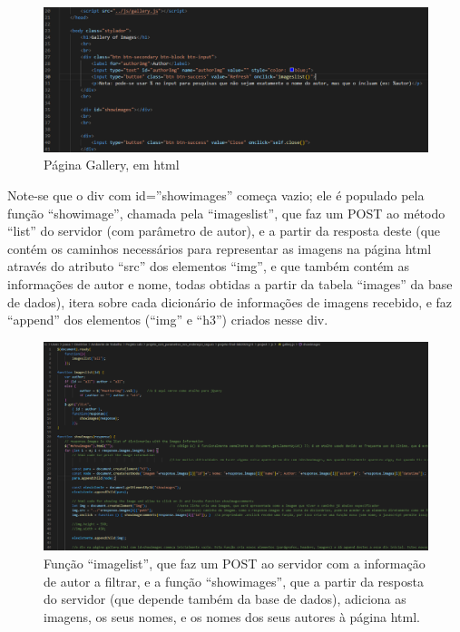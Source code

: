 \documentclass{report}
\begin{document}
 \begin{figure}[hbp]

        \includegraphics[scale=0.5]{Images_code/10 - html gallery.png}
        \caption{\label{Estrutura}Página Gallery, em html}
\end{figure}


 Note-se que o div com id=”showimages” começa vazio; ele é populado pela função “showimage”, chamada pela “imageslist”, que faz um POST ao método “list” do servidor (com parâmetro de autor), e a partir da resposta deste (que contém os caminhos necessários para representar as imagens na página html através do atributo “src” dos elementos “img”, e que também contém as informações de autor e nome, todas obtidas a partir da tabela “images” da base de dados), itera sobre cada dicionário de informações de imagens recebido, e faz “append” dos elementos (“img” e “h3”) criados nesse div.

 \newpage



\begin{figure}[!hbtp]
        \centering
        \includegraphics[scale=0.32]{Images_code/10 - js gallery.png}
        \caption{\label{Estrutura}Função “imagelist”, que faz um POST ao servidor com a informação de autor a filtrar, e a função “showimages”, que a partir da resposta do servidor (que depende também da base de dados), adiciona as imagens, os seus nomes, e os nomes dos seus autores à página html.}
\end{figure}
\end{document}

